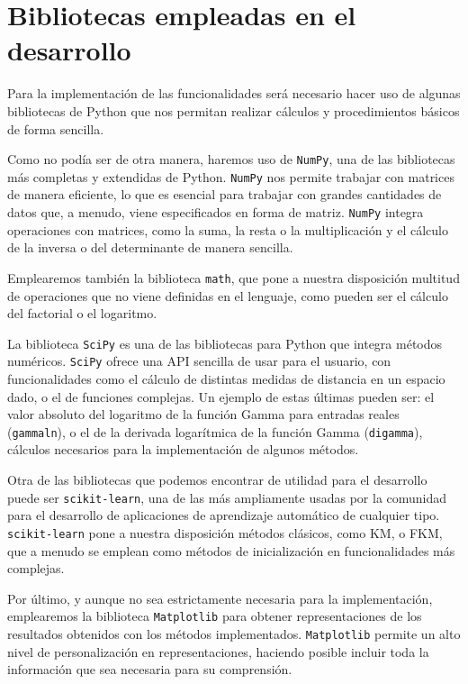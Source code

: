 \section{Bibliotecas empleadas en el desarrollo}

Para la implementación de las funcionalidades será necesario hacer uso de algunas bibliotecas de Python que nos permitan realizar cálculos y procedimientos básicos de forma sencilla.

Como no podía ser de otra manera, haremos uso de \texttt{NumPy}, una de las bibliotecas más completas y  extendidas de Python. \texttt{NumPy} nos permite trabajar con matrices de manera eficiente, lo que es esencial para trabajar con grandes cantidades de datos que, a menudo, viene especificados en forma de matriz. \texttt{NumPy} integra operaciones con matrices, como la suma, la resta o la multiplicación y el cálculo de la inversa o del determinante de manera sencilla.

Emplearemos también la biblioteca \texttt{math}, que pone a nuestra disposición multitud de operaciones que no viene definidas en el lenguaje, como pueden ser el cálculo del factorial o el logaritmo.

La biblioteca \texttt{SciPy} es una de las bibliotecas para Python que integra métodos numéricos. \texttt{SciPy} ofrece una API sencilla de usar para el usuario, con funcionalidades como el cálculo de distintas medidas de distancia en un espacio dado, o el de funciones complejas. Un ejemplo de estas últimas pueden ser: el valor absoluto del logaritmo de la función Gamma para entradas reales (\texttt{gammaln}), o el de la derivada logarítmica de la función Gamma (\texttt{digamma}), cálculos necesarios para la implementación de algunos métodos.

Otra de las bibliotecas que podemos encontrar de utilidad para el desarrollo puede ser \texttt{scikit-learn}, una de las más ampliamente usadas por la comunidad para el desarrollo de aplicaciones de aprendizaje automático de cualquier tipo. \texttt{scikit-learn} pone a nuestra disposición métodos clásicos, como \acf{KM}, o \acf{FKM}, que a menudo se emplean como métodos de inicialización en funcionalidades más complejas.

Por último, y aunque no sea estrictamente necesaria para la implementación, emplearemos la biblioteca \texttt{Matplotlib} para obtener representaciones de los resultados obtenidos con los métodos implementados. \texttt{Matplotlib} permite un alto nivel de personalización en representaciones, haciendo posible incluir toda la información que sea necesaria para su comprensión. 

